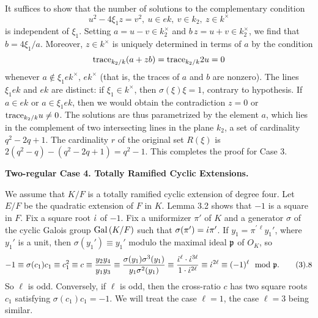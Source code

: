 It suffices to show that the number of solutions to the
complementary condition
$$u^2-4\xi_1 z = v^2,
\ u\in e k,\ v\in k_2,\ z\in k^\times$$
is independent of $\xi_1$.  Setting $a=u-v\in k_2^\times$ 
and  $b\,z=u+v\in k_2^\times$, we find
that $b=4\xi_1/a$.  Moreover,
$z\in k^\times$ is uniquely determined in terms
of $a$ by the condition
$$\hbox{trace}_{k_2/k} (a+ z b) = \hbox{trace}_{k_2/k} 2u = 0$$
whenever $a\not\in \xi_1 e k^\times,\, e k^\times$ 
(that is, the traces of $a$ and $b$
are nonzero).  The lines $\xi_1 e k$ and $e k$ are distinct:
if $\xi_1\in k^\times$, then $\sigma(\xi)\xi=1$, contrary to hypothesis.
If $a\in e k$ or $a\in \xi_1 e k$, then we would obtain the
contradiction $z=0$ or $\hbox{trace}_{k_2/k} u\ne 0$.
The solutions are thus parametrized by the element $a$,
which lies in the complement of two intersecting lines in 
the plane $k_2$,
a set of cardinality $q^2-2q+1$.  
The
cardinality $r$ of the original set $R(\xi)$ is 
$2(q^2-q) - (q^2-2q+1) = q^2-1$.
This completes the proof for Case 3.

\bigskip
\centerline{\bf Two-regular Case 4. Totally Ramified Cyclic Extensions.}
\bigskip

We assume that $K/F$ is a totally ramified cyclic extension of degree
four.  Let $E/F$ be the quadratic extension of $F$ in $K$.
Lemma 3.2 shows that $-1$ is a square
in $F$.  Fix a square root ${\dot\iota}$ of $-1$.  Fix a uniformizer
$\pi'$ of $K$ and a generator $\sigma$ of the cyclic
Galois group $\hbox{Gal\,}(K/F)$ such that $\sigma(\pi') = {\dot\iota} \pi'$.
If $y_1 = \pi^{\prime\,\ell} y_1'$, where $y_1'$ is a unit,
then $\sigma(y_1')\equiv y_1'$ modulo the maximal ideal
${\frak p}$ of $O_K$, so
$$-1\equiv \sigma(c_1)c_1\equiv c_1^2 \equiv c \equiv
{y_2 y_4\over y_1 y_3}\equiv {\sigma(y_1)\sigma^3(y_1)\over
y_1 \sigma^2(y_1)} \equiv {\jota^\ell\cdot\jota^{3\ell}\over
 1\cdot \jota^{2\ell}}\equiv \jota^{2\ell} \equiv (-1)^\ell
\mod \pp.\tag 3.8
$$
So $\ell$ is odd.  Conversely, if $\ell$
is odd, then the cross-ratio $c$ has two square roots $c_1$ satisfying
$\sigma(c_1)c_1 = -1$.  
We will treat the case $\ell=1$, the case $\ell=3$ being
similar.  

